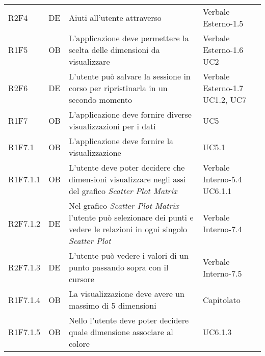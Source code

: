 {\begin{longtable}{C{2cm} | C{1.5cm} | C{9cm} | C{3.3cm}}
R2F4 & DE & Aiuti all'utente attraverso  & Verbale Esterno-1.5 \\
R1F5 & OB & L'applicazione deve permettere la scelta delle dimensioni da visualizzare & Verbale Esterno-1.6 \newline UC2\\
R2F6 & DE & L'utente può salvare la sessione in corso per ripristinarla in un secondo momento & Verbale Esterno-1.7 \newline UC1.2, UC7\\
R1F7 & OB & L'applicazione deve fornire diverse visualizzazioni per i dati & UC5\\
R1F7.1 & OB & L'applicazione deve fornire la visualizzazione  & UC5.1\\
R1F7.1.1 & OB & L'utente deve poter decidere che dimensioni visualizzare negli assi del grafico \textit{Scatter Plot Matrix} & Verbale Interno-5.4 \newline UC6.1.1\\
R2F7.1.2 & DE & Nel grafico \textit{Scatter Plot Matrix} l'utente può selezionare dei punti e vedere le relazioni in ogni singolo \textit{Scatter Plot} & Verbale Interno-7.4\\
R2F7.1.3 & DE & L'utente può vedere i valori di un punto passando sopra con il cursore & Verbale Interno-7.5\\

R1F7.1.4 & OB & La visualizzazione  deve avere un massimo di 5 dimensioni & Capitolato\\

R1F7.1.5 & OB & Nello  l'utente deve poter decidere quale dimensione associare al colore & UC6.1.3\\


\end{longtable}}
